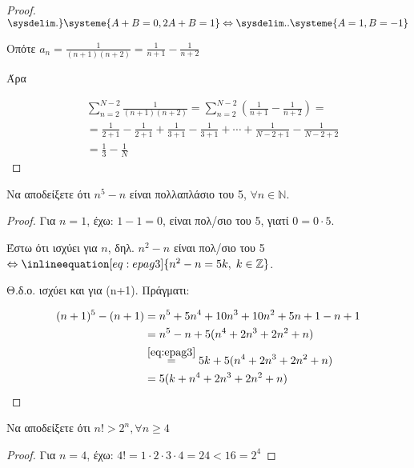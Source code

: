 \begin{multicols}{2}
\begin{enumerate}
\begin{proof}
    $  \sysdelim.\}\systeme{A+B=0,2A+B=1} \Leftrightarrow \sysdelim..
    \systeme{A=1,B=-1} $

    Οπότε $ a_{n} = \frac{1}{(n+1)(n+2)} = \frac{1}{n+1} - \frac{1}{n+2} $
    
    Άρα 
    
    \begin{align*}
        &\sum_{n=2}^{N-2} \frac{1}{(n+1)(n+2)} 
        = \sum_{n=2}^{N-2} (\frac{1}{n+1} - \frac{1}{n+2}) = \\
        &= \frac{1}{2+1} - \frac{1}{2+1} + \frac{1}{3+1} - \frac{1}{3+1} +\cdots +
        \frac{1}{N-2+1} - \frac{1}{N-2+2} \\
        &= \frac{1}{3} - \frac{1}{N} 
    \end{align*}
        \end{proof}

    \item \textcolor{Col1}{Να αποδείξετε ότι $ n^{5} - n $ είναι 
            πολλαπλάσιο του 5, $ \forall n \in \mathbb{N} $.}

        \begin{proof}
            Για $ n=1 $, έχω: $ 1-1=0 $, είναι πολ/σιο του 5, γιατί $0=0\cdot 5$.

            Έστω ότι ισχύει για $n$, δηλ. $n^{2}-n $ 
                είναι πολ/σιο του 5 $
                \Leftrightarrow \inlineequation[eq:epag3]{n^{2}-n=5k, 
                \; k \in \mathbb{Z}} $.

            Θ.δ.ο. ισχύει και για (n+1). Πράγματι:

            \begin{align*}
                (n+1)^{5}-(n+1) &= n^{5}+5n^{4}+10n^{3}+10n^{2}+5n+1-n+1 \\
                                &=n^{5}-n+5(n^{4}+2n^{3}+2n^{2}+n) \\
                                &\overset{\eqref{eq:epag3}}{=} 5k 
                                + 5(n^{4}+2n^{3}+2n^{2}+n) \\ 
                                &= 5(k + n^{4}+2n^{3}+2n^{2}+n)
            \end{align*}
        \end{proof}

\newpage

    \item \textcolor{Col1}{Να αποδείξετε ότι $ n! > 2^{n}, \forall n \geq 
        4 $}

        \begin{proof}
        \item {}
            Για $ n=4 $, έχω: $ 4! = 1\cdot 2 \cdot 3 \cdot 4 = 24 < 16 = 2^{4} $


\end{proof}
\end{enumerate}
\end{multicols}

